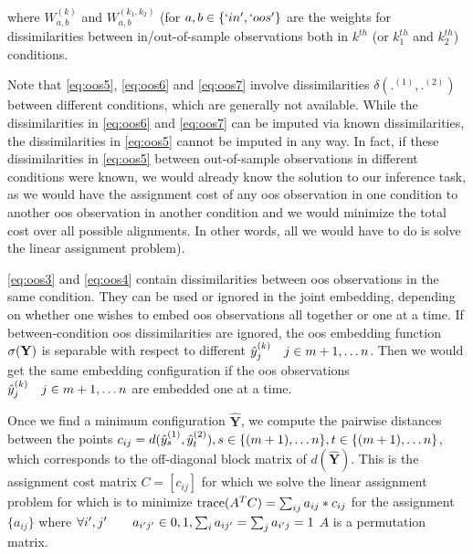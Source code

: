 \documentclass[12pt,oneside,final]{thesis}
\begin{document}
where $W_{a,b}^{(k)}$ and $W_{a,b}^{(k_1,k_2)}$ (for $a,b \in \{`in', `oos'\}$ are the weights for dissimilarities between in/out-of-sample observations both in $k^{th}$ (or $k_1^{th}$ and $k_2^{th}$) conditions.

Note that \ref{eq:oos5}, \ref{eq:oos6} and \ref{eq:oos7} involve dissimilarities $\delta(.^{(1)},.^{(2)})$ between different conditions, which are generally not available. While  the dissimilarities in \ref{eq:oos6} and \ref{eq:oos7} can be imputed via known dissimilarities, the dissimilarities in \ref{eq:oos5}  cannot be imputed in any way. In fact, if these dissimilarities in  \ref{eq:oos5}   between out-of-sample observations in different conditions were known, we would already know the solution to our inference task, as we would have the  assignment cost  of any oos observation in one condition to another oos observation in another condition and we would minimize the total cost over all possible alignments. In other words, all we would have to do is solve the linear assignment problem).

\ref{eq:oos3} and \ref{eq:oos4} contain dissimilarities between oos observations in the same condition. They can be  used or ignored in the joint embedding, depending on whether one wishes to embed oos observations all together or one at a time. If between-condition oos dissimilarities are ignored, the oos embedding function $\sigma({\bf Y})$ is separable with respect to different  $\hat{y}^{(k)}_{j} \quad j \in m+1,\ldots n$. Then we would get the same embedding configuration if the oos observations $\hat{y}^{(k)}_{j}\quad j \in m+1,\ldots n$ are embedded one at a time.

Once we find a minimum configuration ${ \hat{\mathbf{Y}}}$, we compute the pairwise distances between the points $c_{ij}=d(\yhat^{(1)}_s,\yhat^{(2)}_t),\onespace s \in \{(m+1),\ldots n\}, t \in  \{(m+1),\ldots n\}$, which corresponds to the off-diagonal block matrix of $d({ \hat{\mathbf{Y}}})$. This is the assignment cost matrix $C=\left[c_{ij} \right]$ for which we solve the linear assignment problem for which is to minimize $\textup{trace}(A^{T}C)=\sum_{ij} a_{ij}*c_{ij}$  for the assignment $\{a_{ij}\}$ where
$\forall i',j' \qquad a_{i'j'} \in {0,1},\onespace \sum_{i}{a_{ij'}} =\sum_{j} a_{i'j} =1 $ \ie $A$ is a permutation matrix. 
\end{document}
